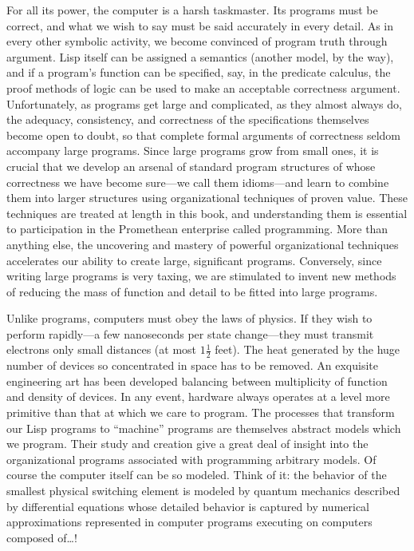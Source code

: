 For all its power, the computer is a harsh taskmaster.
Its programs must be correct, and what we wish to say must be said accurately in every detail.
As in every other symbolic activity, we become convinced of program truth through argument.
Lisp itself can be assigned a semantics (another model, by the way), and if a program’s function can be specified, say, in the predicate calculus, the proof methods of logic can be used to make an acceptable correctness argument.
Unfortunately, as programs get large and complicated, as they almost always do, the adequacy, consistency, and correctness of the specifications themselves become open to doubt, so that complete formal arguments of correctness seldom accompany large programs.
Since large programs grow from small ones, it is crucial that we develop an arsenal of standard program structures of whose correctness we have become sure---we call them idioms---and learn to combine them into larger structures using organizational techniques of proven value.
These techniques are treated at length in this book, and understanding them is essential to participation in the Promethean enterprise called programming.
More than anything else, the uncovering and mastery of powerful organizational techniques accelerates our ability to create large, significant programs.
Conversely, since writing large programs is very taxing, we are stimulated to invent new methods of reducing the mass of function and detail to be fitted into large programs.

Unlike programs, computers must obey the laws of physics.
If they wish to perform rapidly---a few nanoseconds per state change---they must transmit electrons only small distances (at most \( 1 \frac{1}{2} \) feet).
The heat generated by the huge number of devices so concentrated in space has to be removed.
An exquisite engineering art has been developed balancing between multiplicity of function and density of devices.
In any event, hardware always operates at a level more primitive than that at which we care to program.
The processes that transform our Lisp programs to “machine” programs are themselves abstract models which we program.
Their study and creation give a great deal of insight into the organizational programs associated with programming arbitrary models.
Of course the computer itself can be so modeled.
Think of it:
the behavior of the smallest physical switching element is modeled by quantum mechanics described by differential equations whose detailed behavior is captured by numerical approximations represented in computer programs executing on computers composed of…!

